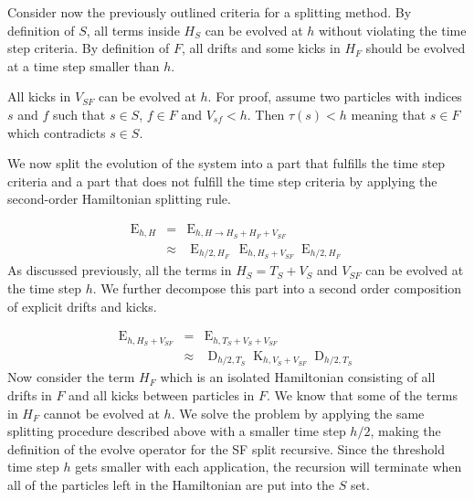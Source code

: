 \documentclass[referee]{aa}
\begin{document}
Consider now the previously outlined criteria for a splitting method.
By definition of $S$, all terms inside $H_{S}$ can be evolved at
$h$ without violating the time step criteria. By definition of $F$,
all drifts and some kicks in $H_{F}$ should be evolved at a time
step smaller than $h$.

All kicks in $V_{SF}$ can be evolved at $h$. For proof, assume two
particles with indices $s$ and $f$ such that $s\in S$, $f\in F$
and $V_{sf}<h$. Then $\tau(s)<h$ meaning that $s\in F$ which contradicts
$s\in S$.

We now split the evolution of the system into a part that fulfills
the time step criteria and a part that does not fulfill the time step
criteria by applying the second-order Hamiltonian splitting rule.

\begin{eqnarray}
\operatorname{E}_{h,H} & = & \operatorname{E}_{h,H\rightarrow H_{S}+H_{F}+V_{SF}}\\
 & \approx & \operatorname{E}_{h/2,H_{F}}\,\operatorname{E}_{h,H_{S}+V_{SF}}\operatorname{E}_{h/2,H_{F}}
\end{eqnarray}
As discussed previously, all the terms in $H_{S}=T_{S}+V_{S}$ and
$V_{SF}$ can be evolved at the time step $h$. We further decompose
this part into a second order composition of explicit drifts and kicks.

\begin{eqnarray}
\operatorname{E}_{h,H_{S}+V_{SF}} & = & \operatorname{E}_{h,T_{S}+V_{S}+V_{SF}}\\
 & \approx & \operatorname{D}_{h/2,T_{S}}\operatorname{K}_{h,V_{S}+V_{SF}}\operatorname{D}_{h/2,T_{S}}
\end{eqnarray}
Now consider the term $H_{F}$ which is an isolated Hamiltonian consisting
of all drifts in $F$ and all kicks between particles in $F$. We
know that some of the terms in $H_{F}$ cannot be evolved at $h$.
We solve the problem by applying the same splitting procedure described
above with a smaller time step $h/2$, making the definition of the
evolve operator for the SF split recursive. Since the threshold time
step $h$ gets smaller with each application, the recursion will terminate
when all of the particles left in the Hamiltonian are put into the
$S$ set.
\end{document}
